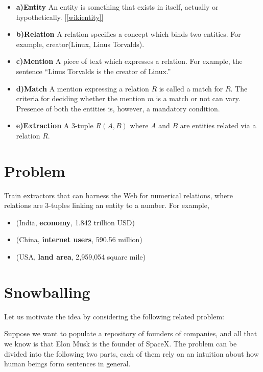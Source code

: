 \documentclass[a4paper,10pt]{article}
\begin{document}
\begin{itemize}

\item \textbf{a)Entity}
An entity is something that exists in itself, actually or hypothetically. [\ref{wikientity}]

\item \textbf{b)Relation}
A relation specifies a concept which binds two entities. For example, creator(Linux, Linus Torvalds).

\item \textbf{c)Mention}
 A piece of text which expresses a relation. For example, the sentence ``Linus Torvalds is the creator of Linux.''

\item \textbf{d)Match}
A mention expressing a relation $R$ is called a match for $R$. The criteria for deciding whether the mention $m$ is a match or not 
can vary. Presence of both the entities is, however, a mandatory condition.

\item \textbf{e)Extraction}
A 3-tuple $R(A, B)$ where $A$ and $B$ are entities related via a relation $R$.
\end{itemize}

\section{Problem}
Train extractors that can harness the Web for numerical relations, where relations are 3-tuples linking an entity
to a number. For example,
    \begin{itemize}
	\item  (India, \textbf{economy}, 1.842 trillion USD)
	\item  (China, \textbf{internet users},  590.56 million)
	\item  (USA, \textbf{land area}, 2,959,054 square mile)
    \end{itemize}

\section{Snowballing}
Let us motivate the idea by considering the following related problem:

Suppose we want to populate a repository of founders of companies, and all that we know
is that Elon Musk is the founder of SpaceX.
The problem can be divided into the following two parts, each of them rely on an intuition about how human 
beings form sentences in general.
\end{document}
